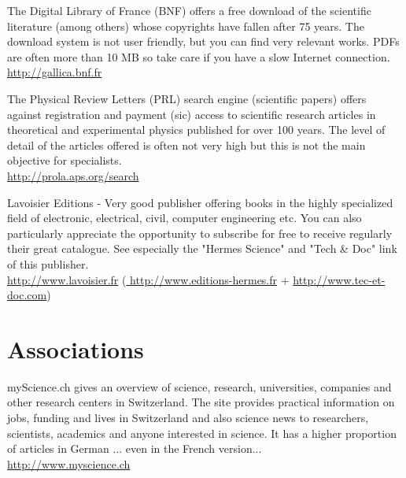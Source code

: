 	
	{\Large {}}{\Large {}}{\Large {}}{\Large {}}\bcdfrance{} The Digital Library of France (BNF) offers a free download of the scientific literature (among others) whose copyrights have fallen after 75 years. The download system is not user friendly, but you can find very relevant works. PDFs are often more than 10 MB so take care if you have a slow Internet connection.\\
	\href{http://gallica.bnf.fr}{\color{blue} http://gallica.bnf.fr}
	
	{\Large {}}{\Large {}}{\Large {}}{\Large {}} The Physical Review Letters (PRL) search engine (scientific papers) offers against registration and payment (sic) access to scientific research articles in theoretical and experimental physics published for over 100 years. The level of detail of the articles offered is often not very high but this is not the main objective for specialists.\\
	\href{http://prola.aps.org/search}{\color{blue} http://prola.aps.org/search}
	
	\pagebreak
	{\Large {}}{\Large {}}{\Large {}}\bcdfrance{} Lavoisier Editions - Very good publisher offering books in the highly specialized field of electronic, electrical, civil, computer engineering etc. You can also particularly appreciate the opportunity to subscribe for free to receive regularly their great catalogue. See especially the "Hermes Science" and "Tech \& Doc" link of this publisher.\\
	\href{http://www.lavoisier.fr}{\color{blue} http://www.lavoisier.fr} (\href{http://www.editions-hermes.fr}{\color{blue} http://www.editions-hermes.fr} + \href{http://www.tec-et-doc.com}{\color{blue} http://www.tec-et-doc.com})
	
	\section{Associations}

		{\Large {}} myScience.ch gives an overview of science, research, universities, companies and other research centers in Switzerland. The site provides practical information on jobs, funding and lives in Switzerland and also science news to researchers, scientists, academics and anyone interested in science. It has a higher proportion of articles in German ... even in the French version...\\
		\href{http://www.myscience.ch}{\color{blue}http://www.myscience.ch}
		
